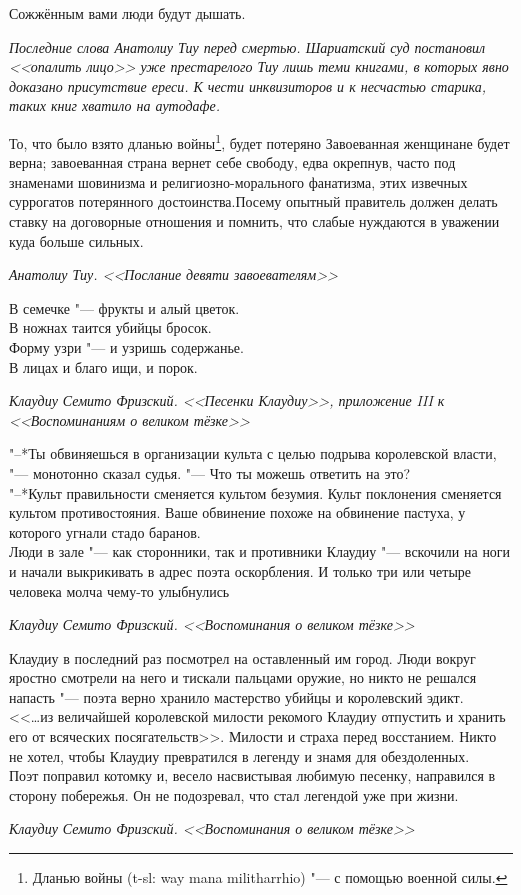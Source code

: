 \documentclass[a4paper,10pt]{book}
\newcommand{\ldotst}{\so{...}\xspace}
\begin{document}
\epigraph{Сожжённым вами люди будут дышать.}
{\textit{Последние слова Анатолиу Тиу перед смертью. Шариатский суд постановил 
<<опалить лицо>> уже престарелого Тиу лишь теми книгами, в которых явно 
доказано 
присутствие ереси. К чести инквизиторов и к несчастью старика, таких книг 
хватило на 
аутодафе.}}

\epigraph{То, что было взято дланью войны\footnote{Дланью войны (t-sl: way mana 
militharrhio) "--- с помощью военной силы.}, будет потеряно\ldotst Завоеванная 
женщинане будет верна; завоеванная страна вернет себе свободу, едва окрепнув, 
часто 
под знаменами шовинизма и религиозно-морального фанатизма, этих извечных 
суррогатов 
потерянного достоинства.Посему опытный правитель должен делать ставку на 
договорные отношения\ldotst и 
помнить, что слабые нуждаются в уважении куда больше сильных.}
{\textit{Анатолиу Тиу. <<Послание девяти завоевателям>>}}

\epigraph{В семечке "--- фрукты и алый цветок.\\
В ножнах таится убийцы бросок.\\
Форму узри "--- и узришь содержанье.\\
В лицах и благо ищи, и порок.}
{\textit{Клаудиу Семито Фризский. <<Песенки Клаудиу>>, приложение III к 
<<Воспоминаниям о великом тёзке>>}}

\epigraph{"--*Ты обвиняешься в организации культа с целью подрыва королевской 
власти, 
"--- монотонно сказал судья. "--- Что ты можешь ответить на это?\\
"--*Культ правильности сменяется культом безумия. Культ поклонения сменяется 
культом противостояния. Ваше обвинение похоже на обвинение пастуха, у которого 
угнали стадо баранов.\\
Люди в зале "--- как сторонники, так и противники Клаудиу "--- вскочили на ноги 
и начали выкрикивать в адрес поэта оскорбления. И только три или четыре 
человека молча чему-то улыбнулись\ldotst}
{\textit{Клаудиу Семито Фризский. <<Воспоминания о великом тёзке>>}}

\epigraph{Клаудиу в последний раз посмотрел на оставленный им город. Люди 
вокруг яростно 
смотрели на него и тискали пальцами оружие, но никто не решался напасть 
"--- поэта верно хранило мастерство убийцы и королевский эдикт.\\
<<\ldots из величайшей королевской милости рекомого Клаудиу отпустить и хранить 
его от всяческих посягательств>>. Милости и страха перед восстанием. Никто не 
хотел, чтобы Клаудиу превратился в легенду и знамя для обездоленных.\\
Поэт поправил котомку и, весело насвистывая любимую песенку, направился в 
сторону побережья. Он не подозревал, что стал легендой уже при жизни.}
{\textit{Клаудиу Семито Фризский. <<Воспоминания о великом тёзке>>}}
\end{document}
